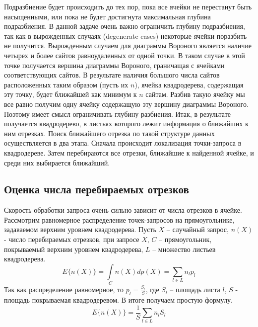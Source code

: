 
Подразбиение будет происходить до тех пор, пока все ячейки не
перестанут быть насыщенными, или пока не будет достигнута максимальная
глубина подразбиения. В данной задаче очень важно ограничить глубину
подразбиения, так как в вырожденных случаях (degenerate cases) некоторые
ячейки поразбить не получится. Вырожденным случаем для диаграммы
Вороного является наличие четырех и более сайтов равноудаленных от одной
точки. В таком случае в этой точке получается вершина диаграммы Вороного,
граничащая с ячейками соответствующих сайтов. В результате наличия
большого числа сайтов расположенных таким образом (пусть их $n$), ячейка
квадродерева, содержащая эту точку, будет ближайшей как минимум к $n$
сайтам. Разбив такую ячейку мы все равно получим одну ячейку содержащую
эту вершину диаграммы Вороного. Поэтому имеет смысл ограничивать
глубину разбиения.
Итак, в результате получается квадродерево, в листьях которого лежит
информация о ближайших к ним отрезках. Поиск ближайшего отрезка по такой
структуре данных осуществляется в два этапа. Сначала происходит
локализация точки-запроса в квадродереве. Затем перебираются все отрезки,
ближайшие к найденной ячейке, и среди них выбирается ближайший.

\subsection{Оценка числа перебираемых отрезков}
Скорость обработки запроса очень сильно зависит от числа отрезков в ячейке.
Рассмотрим равномерное распределение точек-запросов на прямоугольнике,
задаваемом верхним уровнем квадродерева. Пусть $X$ -- случайный запрос, 
$n(X)$ - число перебираемых отрезков, при запросе $X$, $C$ -- прямоугольник, 
покрываемый верхним уровнем квадродерева, $L$ -- множество листьев квадродерева.
\begin{equation}
E\{n(X)\} = \int\limits_Cn(X)dp(X) =  \sum\limits_{l \in L}n_lp_l
\end{equation}
Так как распределение равномерное, то $p_l = \frac{S_l}{S}$, где 
$S_l$ -- площадь листа $l$, $S$ - площадь покрываемая квадродеревом.
В итоге получаем простую формулу.
\begin{equation}
E\{n(X)\} = \frac{1}{S}\sum\limits_{l \in L}n_lS_l
\end{equation}

